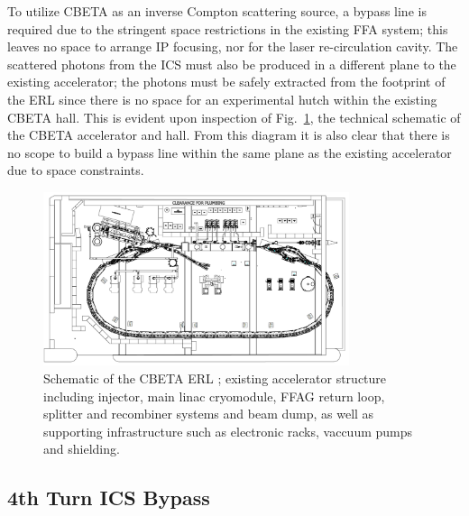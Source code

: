 \documentclass[../main.tex]{subfiles}
\begin{document}
To utilize CBETA as an inverse Compton scattering source, a bypass line is required due to the stringent space restrictions in the existing FFA system; this leaves no space to arrange IP focusing, nor for the laser re-circulation cavity. The scattered photons from the ICS must also be produced in a different plane to the existing accelerator; the photons must be safely extracted from the footprint of the ERL since there is no space for an experimental hutch within the existing CBETA hall. This is evident upon inspection of Fig.~\ref{fig:CBETA_schematic}, the technical schematic of the CBETA accelerator and hall. From this diagram it is also clear that there is no scope to build a bypass line within the same plane as the existing accelerator due to space constraints.
\begin{figure}[!h]
\centering
\includegraphics[width=0.8\textwidth]{Figures/CBETA_Inverse_Compton_Source_Design/CBETA_schematic.pdf}
\caption{Schematic of the CBETA ERL \cite{hoffstaetter2017cbeta}; existing accelerator structure including injector, main linac cryomodule, FFAG return loop, splitter and recombiner systems and beam dump, as well as supporting infrastructure such as electronic racks, vaccuum pumps and shielding.}
\label{fig:CBETA_schematic}
\end{figure}

\subsection{4th Turn ICS Bypass}
\end{document}
